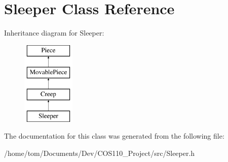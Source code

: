 \hypertarget{classSleeper}{\section{Sleeper Class Reference}
\label{classSleeper}
}
Inheritance diagram for Sleeper\-:\begin{figure}[H]
\begin{center}
\leavevmode
\includegraphics[height=4.000000cm]{classSleeper}
\end{center}
\end{figure}


The documentation for this class was generated from the following file\-:\begin{DoxyCompactItemize}
\item 
/home/tom/\-Documents/\-Dev/\-C\-O\-S110\-\_\-\-Project/src/Sleeper.\-h\end{DoxyCompactItemize}
